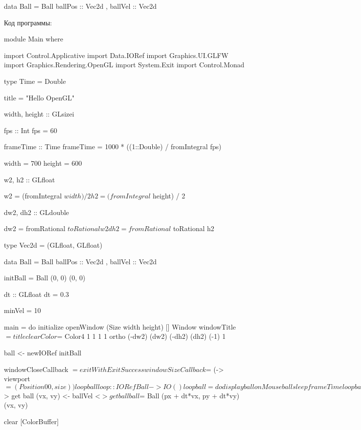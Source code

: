 \begin{code}
data Ball = Ball
    { ballPos :: Vec2d
    , ballVel :: Vec2d
    }
\end{code}

Код программы:


\begin{code}
module Main where

import Control.Applicative
import Data.IORef
import Graphics.UI.GLFW
import Graphics.Rendering.OpenGL
import System.Exit
import Control.Monad

type Time = Double

title = "Hello OpenGL"

width, height :: GLsizei

fps :: Int
fps = 60

frameTime :: Time
frameTime = 1000 * ((1::Double) / fromIntegral fps)

width   = 700
height  = 600
    
w2, h2 :: GLfloat

w2 = (fromIntegral $ width) / 2
h2 = (fromIntegral $ height)  / 2

dw2, dh2 :: GLdouble

dw2 = fromRational $ toRational w2
dh2 = fromRational $ toRational h2

type Vec2d = (GLfloat, GLfloat)

data Ball = Ball
    { ballPos :: Vec2d
    , ballVel :: Vec2d
    }

initBall = Ball (0, 0) (0, 0)

dt :: GLfloat
dt = 0.3

minVel = 10

main = do
    initialize
    openWindow (Size width height) [] Window
    windowTitle $= title

    clearColor $= Color4 1 1 1 1
    ortho (-dw2) (dw2) (-dh2) (dh2) (-1) 1
    
    ball <- newIORef initBall

    windowCloseCallback $= exitWith ExitSuccess
    windowSizeCallback  $= (\size -> viewport $= (Position 0 0, size))

    loop ball

loop :: IORef Ball -> IO ()
loop ball = do    
    display ball
    onMouse ball
    sleep frameTime
    loop ball

display ball = do
    (px, py) <- ballPos <$> get ball
    (vx, vy) <- ballVel <$> get ball
    ball $= Ball (px + dt*vx, py + dt*vy) (vx, vy)

    clear [ColorBuffer]


\end{code}
